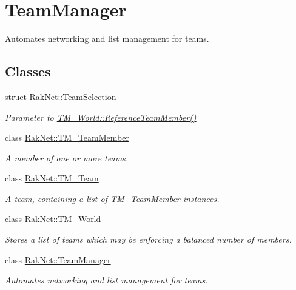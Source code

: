 \hypertarget{group___t_e_a_m___m_a_n_a_g_e_r___g_r_o_u_p}{\section{Team\-Manager}
\label{group___t_e_a_m___m_a_n_a_g_e_r___g_r_o_u_p}
}


Automates networking and list management for teams.  


\subsection*{Classes}
\begin{DoxyCompactItemize}
\item 
struct \hyperlink{struct_rak_net_1_1_team_selection}{Rak\-Net\-::\-Team\-Selection}
\begin{DoxyCompactList}\small\item\em Parameter to \hyperlink{class_rak_net_1_1_t_m___world_a13c60cbb4d1894aece9e1b1b9887601f}{T\-M\-\_\-\-World\-::\-Reference\-Team\-Member()} \end{DoxyCompactList}\item 
class \hyperlink{class_rak_net_1_1_t_m___team_member}{Rak\-Net\-::\-T\-M\-\_\-\-Team\-Member}
\begin{DoxyCompactList}\small\item\em A member of one or more teams. \end{DoxyCompactList}\item 
class \hyperlink{class_rak_net_1_1_t_m___team}{Rak\-Net\-::\-T\-M\-\_\-\-Team}
\begin{DoxyCompactList}\small\item\em A team, containing a list of \hyperlink{class_rak_net_1_1_t_m___team_member}{T\-M\-\_\-\-Team\-Member} instances. \end{DoxyCompactList}\item 
class \hyperlink{class_rak_net_1_1_t_m___world}{Rak\-Net\-::\-T\-M\-\_\-\-World}
\begin{DoxyCompactList}\small\item\em Stores a list of teams which may be enforcing a balanced number of members. \end{DoxyCompactList}\item 
class \hyperlink{class_rak_net_1_1_team_manager}{Rak\-Net\-::\-Team\-Manager}
\begin{DoxyCompactList}\small\item\em Automates networking and list management for teams. \end{DoxyCompactList}\end{DoxyCompactItemize}
